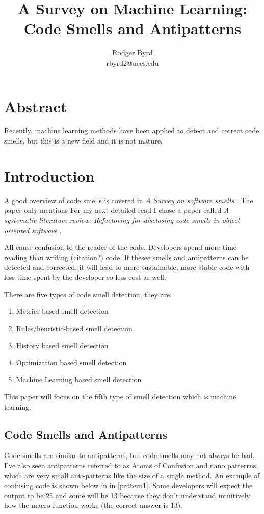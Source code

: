 \documentclass[conference]{IEEEtran}
\begin{document}

\title{A Survey on Machine Learning: Code Smells and Antipatterns}
\author{Rodger Byrd\\rbyrd2@uccs.edu}

\maketitle

\section{Abstract}
Recently, machine learning methods have been applied to detect and correct code smells, but this is a new field and it is not mature.

\section{Introduction}
A good overview of code smells is covered in \textit{A Survey on software smells} \cite{sharma_survey_2018}. 
The paper only mentions For my next detailed read I chose a paper called  \textit{A systematic literature review: Refactoring for disclosing code smells in object oriented software} \cite{singh_systematic_2018}. 

All cause confusion to the reader of the code. Developers spend more time reading than writing (citation?) code. If thesee smells and antipatterns can be detected and corrected, it will lead to more sustainable, more stable code with less time spent by the developer so less cost as well.

There are five types of code smell detection\cite{lafi_code_2019}, they are:
\begin{enumerate}
\item Metrics based smell detection
\item Rules/heuristic-based smell detection
\item History based smell detection
\item Optimization based smell detection
\item Machine Learning based smell detection
\end{enumerate}

This paper will focus on the fifth type of smell detection which is machine learning.

\subsection{Code Smells and Antipatterns}
Code smells are similar to antipatterns, but code smells may not always be bad.
I've also seen antipatterns referred to as Atoms of Confusion \cite{gopstein_understanding_2017} and nano patterrns, which are very small anti-patterns like the size of a single method. 
An example of confusing code is shown below in in \ref{pattern1}.
Some developers will expect the output to be 25 and some will be 13 because they don't understand intuitively how the macro function works (the correct answer is 13).
\end{document}
